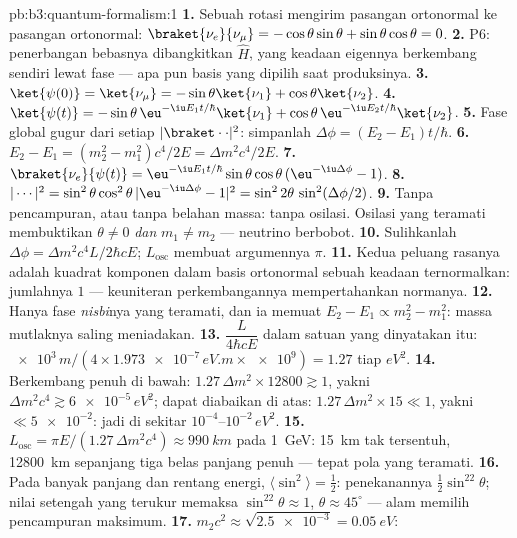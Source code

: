\begin{solution}{pb:b3:quantum-formalism:1}
\textbf{1.} Sebuah rotasi mengirim pasangan ortonormal ke pasangan
ortonormal: $\braket{\nu_e}{\nu_\mu} = -\cos\theta\sin\theta +
\sin\theta\cos\theta = 0$.
\textbf{2.} P6: penerbangan bebasnya dibangkitkan $\hat H$, yang
keadaan eigennya berkembang sendiri lewat fase --- apa pun basis yang
dipilih saat produksinya.
\textbf{3.} $\ket{\psi(0)} = \ket{\nu_\mu} = -\sin\theta\ket{\nu_1}
+ \cos\theta\ket{\nu_2}$.
\textbf{4.} $\ket{\psi(t)} = -\sin\theta\,\eu^{-\iu E_1t/\hbar}
\ket{\nu_1} + \cos\theta\,\eu^{-\iu E_2t/\hbar}\ket{\nu_2}$.
\textbf{5.} Fase global gugur dari setiap $|\braket\cdot\cdot|^2$:
simpanlah $\Delta\phi = (E_2 - E_1)t/\hbar$.
\textbf{6.} $E_2 - E_1 = (m_2^2 - m_1^2)c^4/2E = \Delta m^2c^4/2E$.
\textbf{7.} $\braket{\nu_e}{\psi(t)} = \eu^{-\iu E_1t/\hbar}
\sin\theta\cos\theta\,(\eu^{-\iu\Delta\phi} - 1)$.
\textbf{8.} $|\cdots|^2 = \sin^2\theta\cos^2\theta\,|{\eu^{-\iu
\Delta\phi} - 1}|^2 = \sin^22\theta\,\sin^2(\Delta\phi/2)$.
\textbf{9.} Tanpa pencampuran, atau tanpa belahan massa: tanpa osilasi.
Osilasi yang teramati membuktikan $\theta \neq 0$ \emph{dan} $m_1 \neq
m_2$ --- neutrino berbobot.
\textbf{10.} Sulihkanlah $\Delta\phi = \Delta m^2c^4L/2\hbar cE$;
$L_{\text{osc}}$ membuat argumennya $\pi$.
\textbf{11.} Kedua peluang rasanya adalah kuadrat komponen dalam basis
ortonormal sebuah keadaan ternormalkan: jumlahnya $1$ ---
keuniteran perkembangannya mempertahankan normanya.
\textbf{12.} Hanya fase \emph{nisbi}nya yang teramati, dan ia memuat
$E_2 - E_1 \propto m_2^2 - m_1^2$: massa mutlaknya saling meniadakan.
\textbf{13.} $\dfrac{L}{4\hbar cE}$ dalam satuan yang dinyatakan itu:
$\num{e3}\,\unit{m}/(4 \times \num{1.973e-7}\,\unit{eV.m} \times
\num{e9}) = 1.27$ tiap $\unit{eV^2}$.
\textbf{14.} Berkembang penuh di bawah: $1.27\,\Delta m^2 \times 12800
\gtrsim 1$, yakni $\Delta m^2c^4 \gtrsim \num{6e-5}\,\unit{eV^2}$;
dapat diabaikan di atas: $1.27\,\Delta m^2 \times 15 \ll 1$, yakni $\ll
\num{5e-2}$: jadi di sekitar $10^{-4}$--$10^{-2}\,\unit{eV^2}$.
\textbf{15.} $L_{\text{osc}} = \pi E/(1.27\,\Delta m^2c^4) \approx
\qty{990}{km}$ pada \qty{1}{GeV}: \qty{15}{km} tak tersentuh,
\qty{12800}{km} sepanjang tiga belas panjang penuh --- tepat pola yang
teramati.
\textbf{16.} Pada banyak panjang dan rentang energi,
$\langle\sin^2\rangle = \tfrac12$: penekanannya $\tfrac12\sin^22
\theta$; nilai setengah yang terukur memaksa $\sin^22\theta \approx 1$,
$\theta \approx 45^\circ$ --- alam memilih pencampuran maksimum.
\textbf{17.} $m_2c^2 \approx \sqrt{\num{2.5e-3}} = \qty{0.05}{eV}$:

\end{solution}

